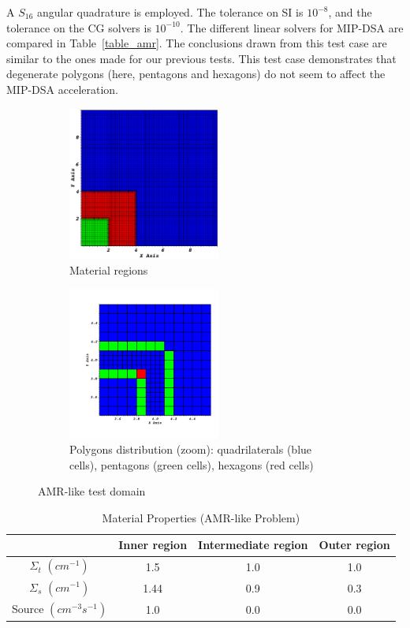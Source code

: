 \documentclass[preprint,10pt]{elsarticle}
\renewcommand{\(}{\left(}
\renewcommand{\)}{\right)}
\renewcommand{\[}{\left[}
\renewcommand{\]}{\right]}
\begin{document}
A $S_{16}$ angular quadrature is employed. The tolerance on SI is $10^{-8}$, and
the tolerance on the CG solvers is $10^{-10}$.
The different linear solvers for MIP-DSA are compared in Table~\ref {table_amr}.
%
The conclusions drawn from this test case are similar to the ones made for 
our previous tests. This test case demonstrates that degenerate polygons 
(here, pentagons and hexagons) do not seem to affect the MIP-DSA acceleration.


\begin{figure}[!htbp]
  \centering
  \begin{subfigure}{0.45\textwidth}
    \centering
    \includegraphics[width=5cm]{zone_amr}
    \caption{Material regions}
    \label{mat_amr}
  \end{subfigure}
  \begin{subfigure}{0.53\textwidth}
    \centering
    \includegraphics[width=5cm]{amr_grid0001}
    \caption{Polygons distribution (zoom): quadrilaterals (blue cells),  pentagons (green cells),  hexagons (red cells)}
    \label{fig_pol_dist}
  \end{subfigure}
  \caption{AMR-like test domain}
\end{figure}
%
\begin{table}
  \begin{center}
    \caption{Material Properties (AMR-like Problem)}
    \begin{tabular}{|c|c|c|c|}
      \hline
      & Inner region & Intermediate region & Outer region  \\ \hline
    $\Sigma_t$ $(cm^{-1})$ & 1.5  & 1.0 & 1.0 \\
    $\Sigma_s$ $(cm^{-1})$ & 1.44 & 0.9 & 0.3 \\
  Source $(cm^{-3}s^{-1})$ & 1.0  & 0.0 & 0.0 \\
      \hline
    \end{tabular}
    \label{prop_amr}
  \end{center}
\end{table}
\end{document}
